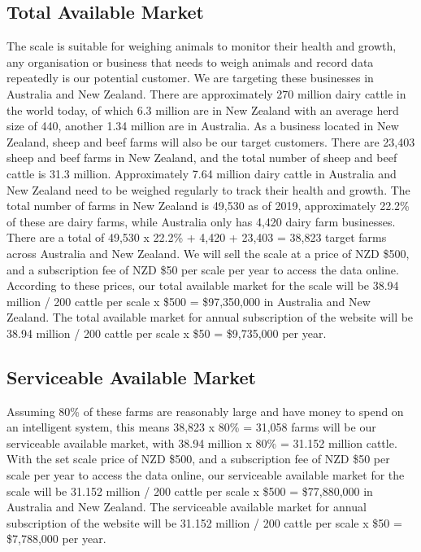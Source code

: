 \subsection{Total Available Market}
The scale is suitable for weighing animals to monitor their health and growth, any organisation or business that needs to weigh animals and record data repeatedly is our potential customer. We are targeting these businesses in Australia and New Zealand. There are approximately 270 million dairy cattle in the world today, of which 6.3 million are in New Zealand with an average herd size of 440, another 1.34 million are in Australia. As a business located in New Zealand, sheep and beef farms will also be our target customers. There are 23,403 sheep and beef farms in New Zealand, and the total number of sheep and beef cattle is 31.3 million. Approximately 7.64 million dairy cattle in Australia and New Zealand need to be weighed regularly to track their health and growth. The total number of farms in New Zealand is 49,530 as of 2019, approximately 22.2\% of these are dairy farms, while Australia only has 4,420 dairy farm businesses. There are a total of 49,530 x 22.2\% + 4,420 + 23,403 = 38,823 target farms across Australia and New Zealand.
We will sell the scale at a price of NZD \$500, and a subscription fee of NZD \$50 per scale per year to access the data online. According to these prices, our total available market for the scale will be 38.94 million / 200 cattle per scale x \$500 = \$97,350,000 in Australia and New Zealand. The total available market for annual subscription of the website will be 38.94 million / 200 cattle per scale x \$50 = \$9,735,000 per year.

\subsection{Serviceable Available Market}

Assuming 80\% of these farms are reasonably large and have money to spend on an intelligent system, this means 38,823 x 80\% = 31,058 farms will be our serviceable available market, with 38.94 million x 80\% = 31.152 million cattle.
With the set scale price of NZD \$500, and a subscription fee of NZD \$50 per scale per year to access the data online, our serviceable available market for the scale will be 31.152 million / 200 cattle per scale x \$500 = \$77,880,000 in Australia and New Zealand. The serviceable available market for annual subscription of the website will be 31.152 million / 200 cattle per scale x \$50 = \$7,788,000 per year.

